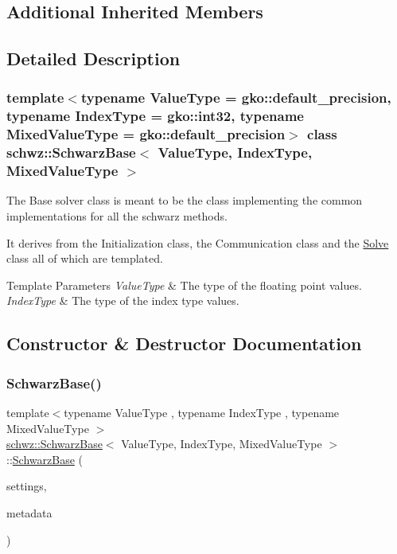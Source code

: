 \subsection*{Additional Inherited Members}


\subsection{Detailed Description}
\subsubsection*{template$<$typename Value\+Type = gko\+::default\+\_\+precision, typename Index\+Type = gko\+::int32, typename Mixed\+Value\+Type = gko\+::default\+\_\+precision$>$\newline
class schwz\+::\+Schwarz\+Base$<$ Value\+Type, Index\+Type, Mixed\+Value\+Type $>$}

The Base solver class is meant to be the class implementing the common implementations for all the schwarz methods. 

It derives from the Initialization class, the Communication class and the \hyperlink{classschwz_1_1Solve}{Solve} class all of which are templated.


\begin{DoxyTemplParams}{Template Parameters}
{\em Value\+Type} & The type of the floating point values. \\
\hline
{\em Index\+Type} & The type of the index type values. \\
\hline
\end{DoxyTemplParams}


\subsection{Constructor \& Destructor Documentation}
\mbox{\label{classschwz_1_1SchwarzBase_adf9cd07681409095deecfb3bf63f1bf8}} 
\subsubsection{\texorpdfstring{Schwarz\+Base()}{SchwarzBase()}}
{\footnotesize\ttfamily template$<$typename Value\+Type , typename Index\+Type , typename Mixed\+Value\+Type $>$ \\
\hyperlink{classschwz_1_1SchwarzBase}{schwz\+::\+Schwarz\+Base}$<$ Value\+Type, Index\+Type, Mixed\+Value\+Type $>$\+::\hyperlink{classschwz_1_1SchwarzBase}{Schwarz\+Base} (\begin{DoxyParamCaption}\item[{\hyperlink{structschwz_1_1Settings}{Settings} \&}]{settings,  }\item[{\hyperlink{structschwz_1_1Metadata}{Metadata}$<$ Value\+Type, Index\+Type $>$ \&}]{metadata }\end{DoxyParamCaption})}



